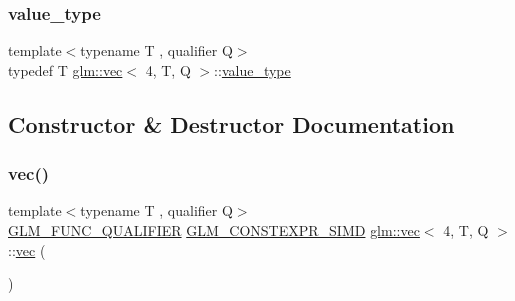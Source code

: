 \mbox{\label{structglm_1_1vec_3_014_00_01_t_00_01_q_01_4_a020e92356dcff10cc371130596325415}} 
\subsubsection{\texorpdfstring{value\+\_\+type}{value\_type}}
{\footnotesize\ttfamily template$<$typename T , qualifier Q$>$ \\
typedef T \mbox{\hyperlink{structglm_1_1vec}{glm\+::vec}}$<$ 4, T, Q $>$\+::\mbox{\hyperlink{structglm_1_1vec_3_014_00_01_t_00_01_q_01_4_a020e92356dcff10cc371130596325415}{value\+\_\+type}}}



\subsection{Constructor \& Destructor Documentation}
\mbox{\label{structglm_1_1vec_3_014_00_01_t_00_01_q_01_4_a7ab4da90825b52bb9a7ef01268ac4d54}} 
\subsubsection{\texorpdfstring{vec()}{vec()}\hspace{0.1cm}{\footnotesize\ttfamily [1/34]}}
{\footnotesize\ttfamily template$<$typename T , qualifier Q$>$ \\
\mbox{\hyperlink{setup_8hpp_a33fdea6f91c5f834105f7415e2a64407}{G\+L\+M\+\_\+\+F\+U\+N\+C\+\_\+\+Q\+U\+A\+L\+I\+F\+I\+ER}} \mbox{\hyperlink{setup_8hpp_ae5de828d10226b21e2123dd61f3cb5ed}{G\+L\+M\+\_\+\+C\+O\+N\+S\+T\+E\+X\+P\+R\+\_\+\+S\+I\+MD}} \mbox{\hyperlink{structglm_1_1vec}{glm\+::vec}}$<$ 4, T, Q $>$\+::\mbox{\hyperlink{structglm_1_1vec}{vec}} (\begin{DoxyParamCaption}{ }\end{DoxyParamCaption})}

\mbox{\label{structglm_1_1vec_3_014_00_01_t_00_01_q_01_4_ad218b24398db0a16b0df3a0e64f6f638}} 
